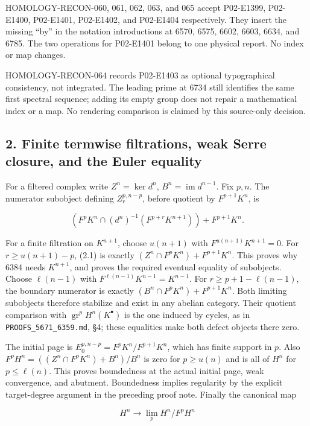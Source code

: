 \documentclass[11pt]{article}
\begin{document}
HOMOLOGY-RECON-060, 061, 062, 063, and 065 accept P02-E1399, P02-E1400, P02-E1401, P02-E1402, and P02-E1404 respectively. They insert the missing ``by'' in the notation introductions at 6570, 6575, 6602, 6603, 6634, and 6785. The two operations for P02-E1401 belong to one physical report. No index or map changes.

HOMOLOGY-RECON-064 records P02-E1403 as optional typographical consistency, not integrated. The leading prime at 6734 still identifies the same first spectral sequence; adding its empty group does not repair a mathematical index or a map. No rendering comparison is claimed by this source-only decision.

\subsection{2. Finite termwise filtrations, weak Serre closure, and the Euler equality}\label{note-07-finite-termwise-filtrations-weak-serre-closure-and-the-euler-equality}

For a filtered complex write \(Z^n=\ker d^n\), \(B^n=\operatorname{im}d^{n-1}\). Fix \(p,n\). The numerator subobject defining \(Z_r^{p,n-p}\), before quotient by \(F^{p+1}K^n\), is

\[
(F^pK^n\cap(d^n)^{-1}(F^{p+r}K^{n+1}))+F^{p+1}K^n. \tag{2.1}
\]

For a finite filtration on \(K^{n+1}\), choose \(u(n+1)\) with \(F^{u(n+1)}K^{n+1}=0\). For \(r\geq u(n+1)-p\), (2.1) is exactly \((Z^n\cap F^pK^n)+F^{p+1}K^n\). This proves why 6384 needs \(K^{n+1}\), and proves the required eventual equality of subobjects. Choose \(\ell(n-1)\) with \(F^{\ell(n-1)}K^{n-1}=K^{n-1}\). For \(r\geq p+1-\ell(n-1)\), the boundary numerator is exactly \((B^n\cap F^pK^n)+F^{p+1}K^n\). Both limiting subobjects therefore stabilize and exist in any abelian category. Their quotient comparison with \(\operatorname{gr}^pH^n(K^\bullet)\) is the one induced by cycles, as in \texttt{PROOFS\_5671\_6359.md}, §4; these equalities make both defect objects there zero.

The initial page is \(E_0^{p,n-p}=F^pK^n/F^{p+1}K^n\), which has finite support in \(p\). Also \(F^pH^n=((Z^n\cap F^pK^n)+B^n)/B^n\) is zero for \(p\geq u(n)\) and is all of \(H^n\) for \(p\leq\ell(n)\). This proves boundedness at the actual initial page, weak convergence, and abutment. Boundedness implies regularity by the explicit target-degree argument in the preceding proof note. Finally the canonical map

\[
H^n\longrightarrow\lim_p H^n/F^pH^n
\]
\end{document}
